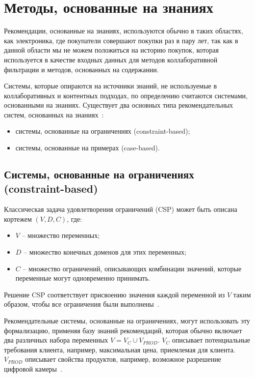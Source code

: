 \section{Методы, основанные на знаниях}

Рекомендации, основанные на знаниях, используются обычно в таких
областях, как электроника, где покупатели совершают покупки раз в
пару лет, так как в данной области мы не можем положиться на историю
покупок, которая используется в качестве входных данных для методов
коллаборативной фильтрации и методов, основанных на содержании.\cite{kut_rec}

Системы, которые опираются на источники знаний, не используемые в коллаборативных и контентных подходах,
по определению считаются системами, основанными на знаниях.
Существует два основных типа рекомендательных систем, основанных на знаниях~\cite{rek_intro}:

\begin{itemize}
\item системы, основанные на ограничениях (constraint-based);
\item системы, основанные на примерах (case-based).
\end{itemize}

\subsection*{Системы, основанные на ограничениях (constraint-based)}

Классическая задача удовлетворения ограничений (CSP) может быть описана кортежем \((V, D, C)\), где:
\begin{itemize}
    \item \(V\) – множество переменных;
    \item \(D\) – множество конечных доменов для этих переменных;
    \item \(C\) – множество ограничений, описывающих комбинации значений, которые переменные могут одновременно принимать.
\end{itemize}

Решение CSP соответствует присвоению значения каждой переменной из \(V\) таким образом, чтобы все ограничения были выполнены~\cite{rek_intro}.

Рекомендательные системы, основанные на ограничениях, могут использовать эту формализацию,
применяя базу знаний рекомендаций, которая обычно включает два различных набора переменных $V = V_C \cup V_{PROD}$.
\(V_C\) описывает потенциальные требования клиента, например, максимальная цена, приемлемая для клиента.
\(V_{PROD}\) описывает свойства продуктов, например, возможное разрешение цифровой камеры~\cite{rek_intro}.

